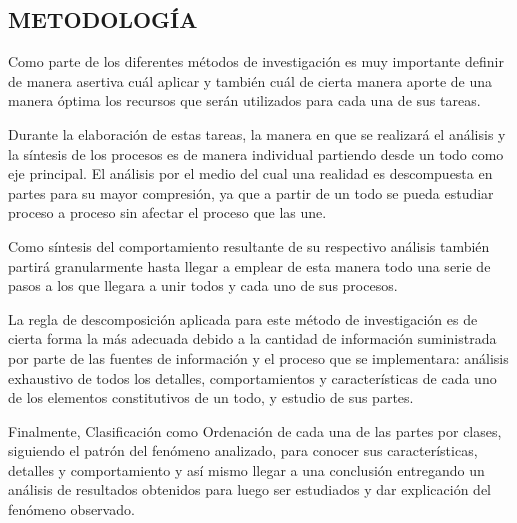 \documentclass[a4paper, 12pt, oneside]{article}
\theoremstyle{definition}
\theoremstyle{remark}
\begin{document}
\begin{center}
\section{METODOLOGÍA}

\end{center}
Como parte de los diferentes métodos de investigación es muy importante definir de manera asertiva cuál aplicar y también cuál de cierta manera aporte de una manera óptima los recursos que serán utilizados para cada una de sus tareas.

Durante la elaboración de estas tareas, la manera en que se realizará el análisis y la síntesis de los procesos es de manera individual partiendo desde un todo  como eje principal. El análisis por el medio del cual una realidad es descompuesta en partes para su mayor compresión, ya que a partir de un todo se pueda estudiar proceso a proceso sin afectar el proceso que las une. 

Como síntesis del comportamiento resultante de su respectivo análisis también partirá granularmente hasta llegar a emplear de esta manera todo una serie de pasos a los que llegara a unir todos y cada uno de sus procesos.

La regla de descomposición aplicada para este método de investigación es de cierta forma la más adecuada debido a la cantidad de información suministrada por parte de las fuentes de información y el proceso que se implementara: análisis exhaustivo de todos los detalles,
comportamientos y características de cada uno de los elementos constitutivos de un todo, y estudio de sus partes.

Finalmente, Clasificación como Ordenación de cada una de las partes por clases, siguiendo el patrón del fenómeno analizado, para conocer sus características, detalles y comportamiento y así mismo llegar a una conclusión entregando un análisis de resultados obtenidos para luego ser estudiados y dar explicación del fenómeno observado.
\end{document}
